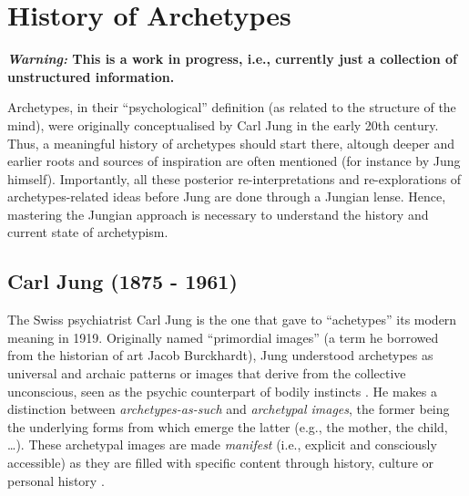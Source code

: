 \documentclass[
]{book}
\begin{document}
\hypertarget{history-of-archetypes}{%
\chapter{History of Archetypes}\label{history-of-archetypes}}

\textbf{\emph{Warning:} This is a work in progress, i.e., currently just a collection of unstructured information.}

Archetypes, in their ``psychological'' definition (as related to the structure of the mind), were originally conceptualised by Carl Jung in the early 20th century. Thus, a meaningful history of archetypes should start there, altough deeper and earlier roots and sources of inspiration are often mentioned (for instance by Jung himself). Importantly, all these posterior re-interpretations and re-explorations of archetypes-related ideas before Jung are done through a Jungian lense. Hence, mastering the Jungian approach is necessary to understand the history and current state of archetypism.

\hypertarget{carl-jung-1875---1961}{%
\section{Carl Jung (1875 - 1961)}\label{carl-jung-1875---1961}}

The Swiss psychiatrist Carl Jung is the one that gave to ``achetypes'' its modern meaning in 1919. Originally named ``primordial images'' (a term he borrowed from the historian of art Jacob Burckhardt), Jung understood archetypes as universal and archaic patterns or images that derive from the collective unconscious, seen as the psychic counterpart of bodily instincts \citep{feist2009theories}. He makes a distinction between \emph{archetypes-as-such} and \emph{archetypal images}, the former being the underlying forms from which emerge the latter (e.g., the mother, the child, \ldots). These archetypal images are made \emph{manifest} (i.e., explicit and consciously accessible) as they are filled with specific content through history, culture or personal history \citep{papadopoulos2012}.
\end{document}
